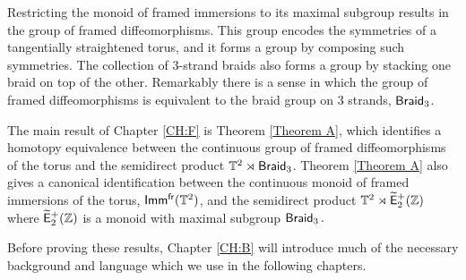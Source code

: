 Restricting the monoid of framed immersions to its maximal subgroup results in the group of framed diffeomorphisms. This group encodes the symmetries of a tangentially straightened torus, and it forms a group by composing such symmetries. The collection of 3-strand braids also forms a group by stacking one braid on top of the other. Remarkably there is a sense in which the group of framed diffeomorphisms is equivalent to the braid group on 3 strands, $\operatorname{{\sf Braid}_3}$.


The main result of Chapter \ref{CH:F} is Theorem \ref{Theorem A}, which identifies a homotopy equivalence between the continuous group of framed diffeomorphisms of the torus and the semidirect product $\mathbb T^{2} \rtimes \operatorname{{\sf Braid}_3}$. Theorem \ref{Theorem A} also gives a canonical identification between the continuous monoid of framed immersions of the torus, ${\sf Imm^{fr}}(\mathbb T^{2})$, and the semidirect product $\mathbb T^{2} \rtimes \operatorname{\widetilde{\sf E}_{2}^{+}(\mathbb Z)}$ where $\operatorname{\widetilde{\sf E}_{2}^{+}(\mathbb Z)}$ is a monoid with maximal subgroup $\operatorname{{\sf Braid}_3}.$



Before proving these results, Chapter \ref{CH:B} will introduce much of the necessary background and language which we use in the following chapters.



